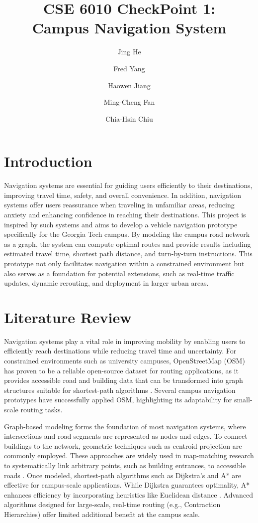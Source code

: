 \documentclass[fleqn,10pt]{olplainarticle}
\title{CSE 6010 CheckPoint 1: \\Campus Navigation System}
\author[1]{Jing He}
\author[2]{Fred Yang}
\author[3]{Haowen Jiang}
\author[4]{Ming-Cheng Fan}
\author[5]{Chia-Hsin Chiu}
\affil[1]{jhe468@gatech.edu}
\affil[2]{fred.yang@gatech.edu}
\affil[3]{hjiang401@gatech.edu}
\affil[4]{mfan77@gatech.edu}
\affil[5]{cchiu73@gatech.edu}
\begin{document}
\flushbottom
\maketitle
\thispagestyle{empty}

\section*{Introduction}
Navigation systems are essential for guiding users efficiently to their destinations, improving travel time, safety, and overall convenience. In addition, navigation systems offer users reassurance when traveling in unfamiliar areas, reducing anxiety and enhancing confidence in reaching their destinations. This project is inspired by such systems and aims to develop a vehicle navigation prototype specifically for the Georgia Tech campus. By modeling the campus road network as a graph, the system can compute optimal routes and provide results including estimated travel time, shortest path distance, and turn-by-turn instructions. This prototype not only facilitates navigation within a constrained environment but also serves as a foundation for potential extensions, such as real-time traffic updates, dynamic rerouting, and deployment in larger urban areas.

\section*{Literature Review}
Navigation systems play a vital role in improving mobility by enabling users to efficiently reach destinations while reducing travel time and uncertainty. For constrained environments such as university campuses, OpenStreetMap (OSM) has proven to be a reliable open-source dataset for routing applications, as it provides accessible road and building data that can be transformed into graph structures suitable for shortest-path algorithms \cite{10.1007/978-3-642-10601-9_13, s18020509}. Several campus navigation prototypes have successfully applied OSM, highlighting its adaptability for small-scale routing tasks.

Graph-based modeling forms the foundation of most navigation systems, where intersections and road segments are represented as nodes and edges. To connect buildings to the network, geometric techniques such as centroid projection are commonly employed. These approaches are widely used in map-matching research to systematically link arbitrary points, such as building entrances, to accessible roads \cite{Map-mappingResearch}. Once modeled, shortest-path algorithms such as Dijkstra’s and A* are effective for campus-scale applications. While Dijkstra guarantees optimality, A* enhances efficiency by incorporating heuristics like Euclidean distance \cite{madkour2017survey}. Advanced algorithms designed for large-scale, real-time routing (e.g., Contraction Hierarchies) offer limited additional benefit at the campus scale.
\end{document}
